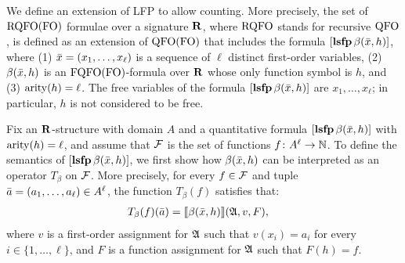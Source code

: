 We define an extension of LFP \cite{I86,vardi1982complexity} to allow counting. 
More precisely, the set of ${\rm RQFO}({\rm FO})$ formulae over a signature $\mathbf{R}$, where ${\rm RQFO}$ stands for recursive ${\rm QFO}$, is defined as an extension of ${\rm QFO}({\rm FO})$ that includes the formula $[{\bf lsfp} \, \beta(\bar{x}, h)]$, where (1) $\bar{x} = (x_1, \ldots, x_\ell)$ is a sequence of $\ell$ distinct first-order variables, (2) $\beta(\bar{x}, h)$ is an ${\rm FQFO}({\rm FO})$-formula over $\mathbf{R}$ whose only function symbol is $h$, and (3) ${\rm arity}(h) = \ell$. The free variables of the formula $[{\bf lsfp} \, \beta(\bar{x},h)]$ are $x_1, \ldots, x_\ell$; in particular, $h$ is not considered to be free.

Fix an $\mathbf{R}$-structure with domain $A$ and a quantitative formula $[{\bf lsfp} \, \beta(\bar{x},h)]$ with ${\rm arity}(h) = \ell$, and assume that $\mathcal{F}$ is the set of functions $f\colon A^\ell \to \mathbb{N}$. To define the semantics of $[{\bf lsfp} \, \beta(\bar{x},h)]$, we first show how $\beta(\bar{x},h)$ can be interpreted as an operator $T_{\beta}$ on $\mathcal{F}$. More precisely, for every $f \in \mathcal{F}$ and tuple $\bar{a} = (a_1, \ldots, a_{\ell}) \in A^\ell$, the function $T_{\beta}(f)$ satisfies that:
\begin{align*}
T_{\beta}(f)(\bar{a}) &= {\llbracket{}{\beta(\bar{x}, h)}\rrbracket}(\mathfrak{A},v,F),
\end{align*}
where $v$ is a first-order assignment  for $\mathfrak{A}$ such that $v(x_i) = a_i$ for every $i \in \{1, \ldots, \ell\}$, and $F$ is a function assignment for $\mathfrak{A}$ such that $F(h) = f$. 

